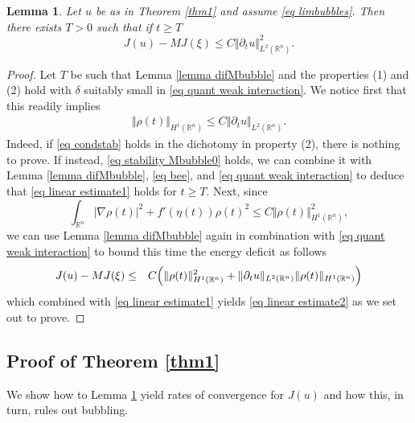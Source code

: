 \documentclass[11pt,letterpaper,reqno]{amsart}
\newcommand{\R}{\mathbb{R}}
\newcommand{\pa}{\partial}
\theoremstyle{plain}%
\newtheorem{lemma}[theorem]{Lemma}
\theoremstyle{definition}
\numberwithin{equation}{section}
\numberwithin{figure}{section}
\begin{document}
\begin{lemma}\label{lemma linearestimate}
    Let $u$ be as in Theorem \ref{thm1} and assume \eqref{eq limbubbles}. Then there exists $T>0$ such that if $t\geq T$    
    \begin{equation}\label{eq linear estimate2}
J(u) -MJ(\xi)\leq C	\Vert \partial_t u\Vert^2_{L^2(\R^n)}. 
\end{equation}
\end{lemma}
\begin{proof}
 Let $T$ be such that Lemma \ref{lemma difMbubble} and the properties (1) and (2) hold with $\delta$ suitably small in \eqref{eq quant weak interaction}. We notice first that this readily implies
 \begin{eqnarray}\label{eq linear estimate1}
	\Vert \rho(t)\Vert_{H^1(\R^n)}\leq C\Vert \pa_t u\Vert_{L^2(\R^n)}.
\end{eqnarray}
Indeed, if \eqref{eq condstab} holds in the dichotomy in property (2), there is nothing to prove. If instead, \eqref{eq stability Mbubble0}
holds, we can combine it with Lemma \ref{lemma difMbubble}, \eqref{eq bee}, and \eqref{eq quant weak interaction} to deduce that \eqref{eq linear estimate1} holds for $t\geq T$.
Next, since
\begin{equation}\label{eq boundsc}
		\int_{\R^n}   |\nabla \rho(t)|^2 + f'(\eta(t)) \rho(t)^2 \leq C\Vert \rho(t)\Vert_{H^1(\R^n)}^2,
	\end{equation}
we can use Lemma \ref{lemma difMbubble} again in combination with \eqref{eq quant weak interaction} to bound this time the energy deficit as follows
\begin{eqnarray*}\notag
	J(u)- MJ(\xi) &\leq& C\Big(\Vert \rho(t)\Vert_{H^1(\R^n)}^2 +\Vert \partial_t u\Vert_{L^2(\R^n)}\Vert \rho(t)\Vert_{H^1(\R^n)} \Big)
\end{eqnarray*}
which combined with \eqref{eq linear estimate1} yields \eqref{eq linear estimate2} as we set out to prove.
\end{proof}
\subsection{Proof of Theorem \ref{thm1}}\label{Proof thm1}

We show how to Lemma \ref{lemma linearestimate} yield rates of convergence for $J(u)$ and how this, in turn, rules out bubbling.
\end{document}
